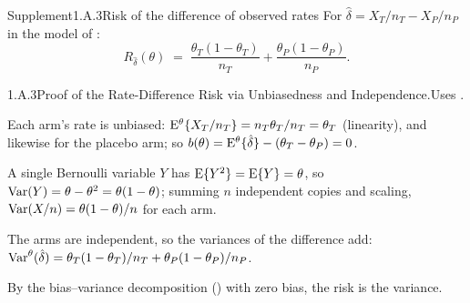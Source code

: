 \documentclass[main.tex]{subfiles}
\begin{document}
\begin{ObjL}{Supplement}{1.A.3}{Risk of the difference of observed rates}
For $\hat\delta = X_T/n_T - X_P/n_P$ in the model of :
\[ R_{\hat\delta}(\theta)
   \;=\; \frac{\theta_T(1-\theta_T)}{n_T} + \frac{\theta_P(1-\theta_P)}{n_P} . \]
\end{ObjL}
\begin{Prf}{1.A.3}{Proof of the Rate-Difference Risk via Unbiasedness and Independence.}{Uses .}
\item Each arm's rate is unbiased: $\mathrm{E}^{\theta}\{X_T/n_T\}=n_T\theta_T/n_T=\theta_T$
      (linearity), and likewise for the placebo arm; so
      $b(\theta)=\mathrm{E}^{\theta}\{\hat\delta\}-(\theta_T-\theta_P)=0$.
\item A single Bernoulli variable $Y$ has $\mathrm{E}\{Y^2\}=\mathrm{E}\{Y\}=\theta$, so
      $\operatorname{Var}(Y)=\theta-\theta^2=\theta(1-\theta)$; summing $n$ independent copies and scaling,
      $\operatorname{Var}(X/n)=\theta(1-\theta)/n$ for each arm.
\item The arms are independent, so the variances of the difference add:
      $\operatorname{Var}^{\theta}(\hat\delta)=\theta_T(1-\theta_T)/n_T+\theta_P(1-\theta_P)/n_P$.
\item By the bias--variance decomposition () with zero bias, the risk is the
      variance.
\end{Prf}
\end{document}
